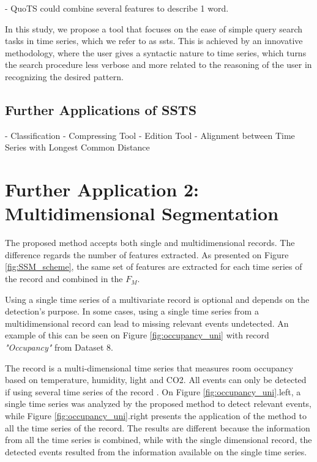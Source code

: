 - QuoTS could combine several features to describe 1 word.


In this study, we propose a tool that focuses on the ease of simple query search tasks in time series, which we refer to as \gls{ssts}. This is achieved by an innovative methodology, where the user gives a syntactic nature to time series, which turns the search procedure less verbose and more related to the reasoning of the user in recognizing the desired pattern.

\subsection{Further Applications of SSTS}

- Classification
- Compressing Tool
- Edition Tool
- Alignment between Time Series with Longest Common Distance

\section{Further Application 2: Multidimensional Segmentation}

The proposed method accepts both single and multidimensional records. The difference regards the number of features extracted. As presented on Figure \ref{fig:SSM_scheme}, the same set of features are extracted for each time series of the record and combined in the $F_M$. 
\par
Using a single time series of a multivariate record is optional and depends on the detection's purpose. In some cases, using a single time series from a multidimensional record can lead to missing relevant events undetected. An example of this can be seen on Figure \ref{fig:occupancy_uni} with record \textit{"Occupancy"} from Dataset 8. 
\par
The record is a multi-dimensional time series that measures room occupancy based on temperature, humidity, light and CO2. All events can only be detected if using several time series of the record \cite{cpd_alan}. On Figure \ref{fig:occupancy_uni}.left, a single time series was analyzed by the proposed method to detect relevant events, while Figure \ref{fig:occupancy_uni}.right presents the application of the method to all the time series of the record. The results are different because the information from all the time series is combined, while with the single dimensional record, the detected events resulted from the information available on the single time series.\\
